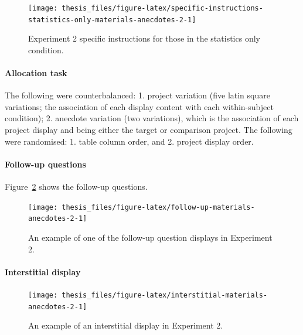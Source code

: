 \documentclass[a4paper, nobind, dvipsnames]{templates/ociamthesis}
\theoremstyle{definition}
\theoremstyle{definition}
\theoremstyle{definition}
\theoremstyle{definition}
\theoremstyle{remark}
\begin{document}
\begin{figure}
\texttt{[image: thesis\_files/figure-latex/specific-instructions-statistics-only-materials-anecdotes-2-1]} \caption{Experiment 2 specific instructions for those in the statistics only condition.}\label{fig:specific-instructions-statistics-only-materials-anecdotes-2}
\end{figure}

\hypertarget{allocation-anecdotes-2-appendix}{%
\paragraph{Allocation task}\label{allocation-anecdotes-2-appendix}}

The following were counterbalanced: 1. project variation (five latin square
variations; the association of each display content with each within-subject
condition); 2. anecdote variation (two variations), which is the association of
each project display and being either the target or comparison project. The
following were randomised: 1. table column order, and 2. project display order.

\hypertarget{follow-up-materials-anecdotes-2}{%
\paragraph{Follow-up questions}\label{follow-up-materials-anecdotes-2}}

Figure~\ref{fig:follow-up-materials-anecdotes-2} shows the follow-up questions.



\begin{figure}
\texttt{[image: thesis\_files/figure-latex/follow-up-materials-anecdotes-2-1]} \caption{An example of one of the follow-up question displays in Experiment 2.}\label{fig:follow-up-materials-anecdotes-2}
\end{figure}

\hypertarget{interstitial-materials-anecdotes-2}{%
\paragraph{Interstitial display}\label{interstitial-materials-anecdotes-2}}



\begin{figure}
\texttt{[image: thesis\_files/figure-latex/interstitial-materials-anecdotes-2-1]} \caption{An example of an interstitial display in Experiment 2.}\label{fig:interstitial-materials-anecdotes-2}
\end{figure}
\end{document}
